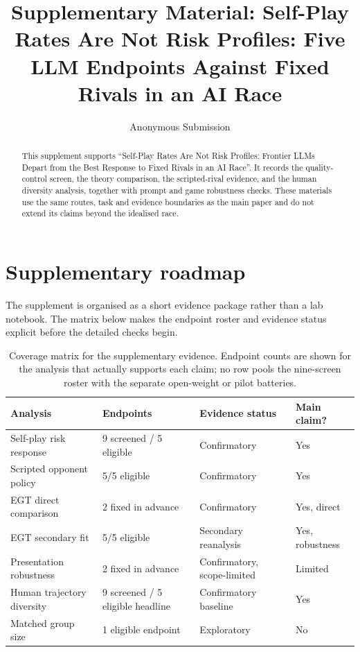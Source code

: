 \documentclass{article}
\title{Supplementary Material: Self-Play Rates Are Not Risk Profiles: Five LLM Endpoints Against Fixed Rivals in an AI Race}
\author{
    Anonymous Submission
}
\begin{document}
\maketitle

\begin{abstract}
This supplement supports ``Self-Play Rates Are Not Risk Profiles: Frontier LLMs Depart from the Best Response to Fixed Rivals in an AI Race''. It records the quality-control screen,
the theory comparison, the scripted-rival evidence, and the human diversity
analysis, together with prompt and game robustness checks. These materials use
the same routes, task and evidence boundaries as the main paper and do not
extend its claims beyond the idealised race.
\end{abstract}


\section*{Supplementary roadmap}

The supplement is organised as a short evidence package rather than a lab
notebook. The matrix below makes the endpoint roster and evidence status
explicit before the detailed checks begin.

\begin{table}[t]
  \caption{Coverage matrix for the supplementary evidence. Endpoint counts are
  shown for the analysis that actually supports each claim; no row pools the
  nine-screen roster with the separate open-weight or pilot batteries.}
  \centering
  \small
  \begin{tabular}{@{}p{}p{}p{}p{}@{}}
    \toprule
    Analysis & Endpoints & Evidence status & Main claim? \\
    \midrule
    Self-play risk response & 9 screened / 5 eligible & Confirmatory & Yes \\
    Scripted opponent policy & 5/5 eligible & Confirmatory & Yes \\
    EGT direct comparison & 2 fixed in advance & Confirmatory & Yes, direct \\
    EGT secondary fit & 5/5 eligible & Secondary reanalysis & Yes, robustness \\
    Presentation robustness & 2 fixed in advance & Confirmatory, scope-limited & Limited \\
    Human trajectory diversity & 9 screened / 5 eligible headline & Confirmatory baseline & Yes \\
    Matched group size & 1 eligible endpoint & Exploratory & No \\
    \bottomrule
  \end{tabular}
\end{table}
\end{document}
